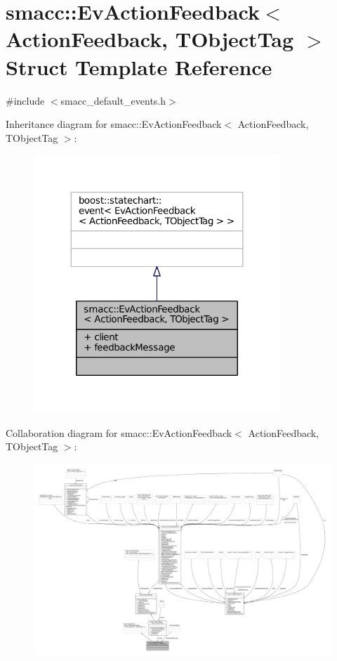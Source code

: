 \hypertarget{structsmacc_1_1EvActionFeedback}{}\section{smacc\+:\+:Ev\+Action\+Feedback$<$ Action\+Feedback, T\+Object\+Tag $>$ Struct Template Reference}
\label{structsmacc_1_1EvActionFeedback}


{\ttfamily \#include $<$smacc\+\_\+default\+\_\+events.\+h$>$}



Inheritance diagram for smacc\+:\+:Ev\+Action\+Feedback$<$ Action\+Feedback, T\+Object\+Tag $>$\+:
\nopagebreak
\begin{figure}[H]
\begin{center}
\leavevmode
\includegraphics[width=263pt]{structsmacc_1_1EvActionFeedback__inherit__graph}
\end{center}
\end{figure}


Collaboration diagram for smacc\+:\+:Ev\+Action\+Feedback$<$ Action\+Feedback, T\+Object\+Tag $>$\+:
\nopagebreak
\begin{figure}[H]
\begin{center}
\leavevmode
\includegraphics[width=350pt]{structsmacc_1_1EvActionFeedback__coll__graph}
\end{center}
\end{figure}

